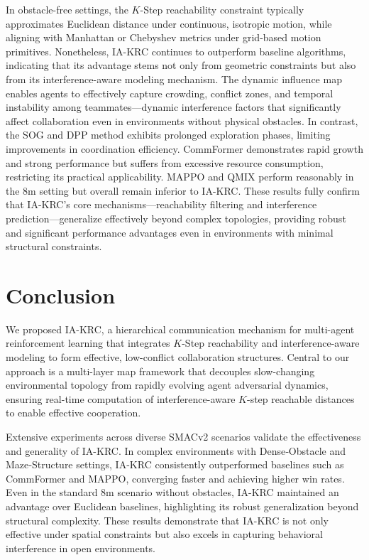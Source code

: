 \documentclass[10pt]{article} %
\begin{document}
In obstacle-free settings, the $K$-Step reachability constraint typically approximates Euclidean distance under continuous, isotropic motion, while aligning with Manhattan or Chebyshev metrics under grid-based motion primitives. Nonetheless, IA-KRC continues to outperform baseline algorithms, indicating that its advantage stems not only from geometric constraints but also from its interference-aware modeling mechanism. The dynamic influence map enables agents to effectively capture crowding, conflict zones, and temporal instability among teammates—dynamic interference factors that significantly affect collaboration even in environments without physical obstacles.
In contrast, the SOG and DPP method exhibits prolonged exploration phases, limiting improvements in coordination efficiency. CommFormer demonstrates rapid growth and strong performance but suffers from excessive resource consumption, restricting its practical applicability. MAPPO and QMIX perform reasonably in the 8m setting but overall remain inferior to IA-KRC. These results fully confirm that IA-KRC's core mechanisms—reachability filtering and interference prediction—generalize effectively beyond complex topologies, providing robust and significant performance advantages even in environments with minimal structural constraints.

\section{Conclusion}
We proposed IA-KRC, a hierarchical communication mechanism for multi-agent reinforcement learning that integrates $K$-Step reachability and interference-aware modeling to form effective, low-conflict collaboration structures. Central to our approach is a multi-layer map framework that decouples slow-changing environmental topology from rapidly evolving agent adversarial dynamics, ensuring real-time computation of interference-aware $K$-step reachable distances to enable effective cooperation. 

Extensive experiments across diverse SMACv2 scenarios validate the effectiveness and generality of IA-KRC. In complex environments with Dense‑Obstacle and Maze‑Structure settings, IA-KRC consistently outperformed baselines such as CommFormer and MAPPO, converging faster and achieving higher win rates. Even in the standard 8m scenario without obstacles, IA-KRC maintained an advantage over Euclidean baselines, highlighting its robust generalization beyond structural complexity. These results demonstrate that IA-KRC is not only effective under spatial constraints but also excels in capturing behavioral interference in open environments. 




\appendix

\end{document}
